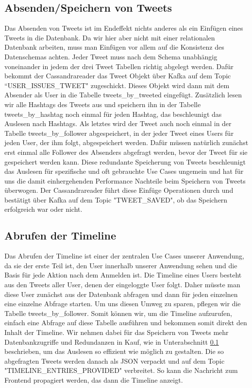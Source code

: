 \subsection{Absenden/Speichern von Tweets}
\label{subsec:Tweetabfrage}
Das Absenden von Tweets ist im Endeffekt nichts anderes als ein Einfügen eines Tweets in die Datenbank. Da wir hier aber nicht mit einer relationalen Datenbank arbeiten, muss man Einfügen vor allem auf die Konsistenz des Datenschemas achten. Jeder Tweet muss nach dem Schema unabhängig voneinander in jedem der drei Tweet Tabellen richtig abgelegt werden. Dafür bekommt der Cassandrareader das Tweet Objekt über Kafka auf dem Topic ``USER\_ISSUES\_TWEET" zugeschickt. Dieses Objekt wird dann mit dem Absender als User in die Tabelle tweets\_by\_tweeted eingefügt. Zusätzlich lesen wir alle Hashtags des Tweets aus und speichern ihn in der Tabelle tweets\_by\_hashtag noch einmal für jeden Hashtag, das beschleunigt das Auslesen nach Hashtags. Als letztes wird der Tweet auch noch einmal in der Tabelle tweets\_by\_follower abgespeichert, in der jeder Tweet eines Users für jeden User, der ihm folgt, abgespeichert werden. Dafür müssen natürlich zunächst erst einmal alle Follower des Absenders abgefragt werden, bevor der Tweet für sie gespeichert werden kann. Diese redundante Speicherung von Tweets beschleunigt das Auslesen für spezifische und oft gebrauchte Use Cases ungemein und hat für uns die damit einhergehenden Performance Nachteile beim Speichern von Tweets überwogen. Der Cassandrareader führt diese Einfüge Operationen durch und bestätigt über Kafka auf dem Topic "TWEET\_SAVED", ob das Speichern erfolgreich war oder nicht.


\subsection{Abrufen der Timeline}
\label{subsec:Timeline}
Das Abrufen der Timeline ist einer der zentralen Use Cases unserer Anwendung, da sie der erste Teil ist, den User innerhalb unserer Anwendung sehen und die Basis für jede Aktion nach dem Anmelden ist. Die Timeline eines Users besteht aus den Tweets aller User, denen der eingeloggte User folgt. Daher müsste man diese User zunächst aus der Datenbank abfragen und dann für jeden einzelnen eine einzelne Abfrage starten. Um uns diesen Umweg zu sparen, pflegen wir die Tabelle tweets\_by\_follower. Somit können wir, um die Timeline aufzurufen, einfach eine Abfrage auf diese Tabelle ausführen und bekommen somit direkt den Inhalt der Timeline. Wir nehmen dabei für das Speichern von Tweets mehr Datenbankzugriffe und Redundanzen in Kauf, wie in Unterabschnitt \ref{subsec:Tweetabfrage} beschrieben, um das Auslesen so effizient wie möglich zu gestalten. Die so abgefragten Tweets werden danach als JSON verpackt und auf dem Topic "TIMELINE\_ENTRIES\_PROVIDED" verbreitet. So kann die Nachricht zum Frontend propagiert werden, das dann die Timeline anzeigt.


